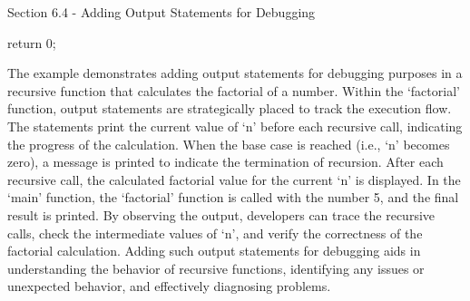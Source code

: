 \begin{notes}{Section 6.4 - Adding Output Statements for Debugging}
\begin{highlight}
\begin{code}[C++]
{        return 0;
    }
    \end{code}
        The example demonstrates adding output statements for debugging purposes in a recursive function that calculates the factorial of a number. Within the `factorial' function, output statements are strategically placed to track the execution flow. The statements print the current value of `n' before each recursive call, 
        indicating the progress of the calculation. When the base case is reached (i.e., `n' becomes zero), a message is printed to indicate the termination of recursion. After each recursive call, the calculated factorial value for the current `n' is displayed. In the `main' function, the `factorial' function is called with 
        the number 5, and the final result is printed. By observing the output, developers can trace the recursive calls, check the intermediate values of `n', and verify the correctness of the factorial calculation. Adding such output statements for debugging aids in understanding the behavior of recursive functions, identifying 
        any issues or unexpected behavior, and effectively diagnosing problems.
    \end{highlight}
\end{notes}

